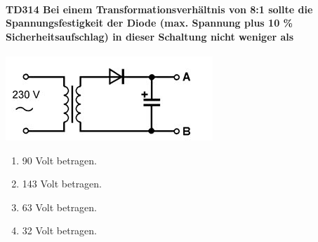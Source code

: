 \documentclass[8pt]{article}
\begin{document}
\begin{enumerate}
\begin{enumerate}[nolistsep,label=\Alph*]
\paragraph*{TD314 Bei einem Transformationsverhältnis von 8:1 sollte die Spannungsfestigkeit der Diode (max. Spannung plus 10 \% Sicherheitsaufschlag) in dieser Schaltung nicht weniger als}
\begin{center}
	\begin{minipage}{\linewidth}
		\centering
		\includegraphics[scale=1.0]{pics/td314_a.jpg}
	\end{minipage}
\end{center}
\begin{enumerate}[nolistsep,label=\Alph*]
\item 90 Volt betragen.
\item 143 Volt betragen.
\item 63 Volt betragen.
\item 32 Volt betragen.
\end{enumerate}


\end{enumerate}
\end{enumerate}
\end{document}
